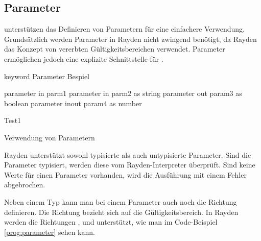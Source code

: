 
\subsection{Parameter}
\label{cha:Parameter}

 unterstützen das Definieren von Parametern für eine einfachere Verwendung. Grundsätzlich werden Parameter in Rayden nicht zwingend benötigt, da Rayden das Konzept von vererbten Gültigkeitsbereichen verwendet. Parameter ermöglichen jedoch eine explizite Schnittstelle für . 

\begin{program}
\begin{JavaCode}
keyword Parameter Bespiel {
	
	parameter in    parm1
	parameter in    parm2 as string
	parameter out   param3 as boolean
	parameter inout param4 as number
	
	Test1	
}
\end{JavaCode}
\caption{Verwendung von Parametern}
\label{prog:parameter}
\end{program}


\SuperPar
Rayden unterstützt sowohl typisierte als auch untypisierte Parameter. Sind die Parameter typisiert, werden diese vom Rayden-Interpreter überprüft. Sind keine Werte für einen Parameter vorhanden, wird die Ausführung mit einem Fehler abgebrochen. 

\SuperPar
Neben einem Typ kann man bei einem Parameter auch noch die Richtung definieren. Die Richtung bezieht sich auf die Gültigkeitsbereich. In Rayden werden die Richtungen ,  und  unterstützt, wie man im Code-Beispiel \ref{prog:parameter} sehen kann. \\

